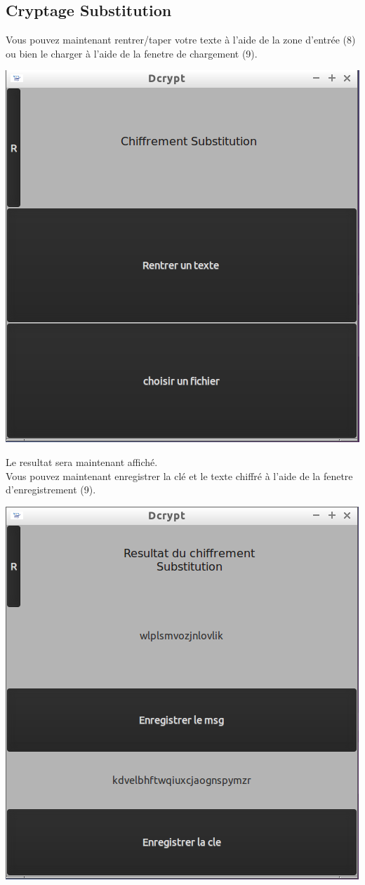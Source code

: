 \documentclass[a4]{article}
\begin{document}
		\subsection{Cryptage Substitution}
			Vous pouvez maintenant rentrer/taper votre texte à l'aide de la zone d'entrée (8)
 			ou bien le charger à l'aide de la fenetre de chargement (9).
			\begin{center}\includegraphics[scale=0.4]{3.png}\end{center}
			Le resultat sera maintenant affiché. \\
 			Vous pouvez maintenant enregistrer la clé et le texte chiffré à l'aide 
 			de la fenetre d'enregistrement (9).
			\begin{center}\includegraphics[scale=0.4]{5.png}\end{center}
			\newpage
\end{document}
